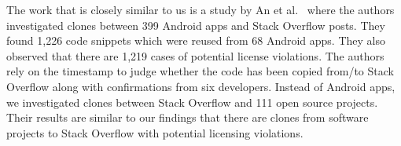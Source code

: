 \documentclass[sigconf,review, anonymous]{acmart}
\begin{document}
The work that is closely similar to us is a study by An et al.~\cite{An2017} where the authors investigated clones between 399 Android apps and Stack Overflow posts. They found 1,226 code snippets which were reused from 68 Android apps. They also observed that there are 1,219 cases of potential license violations. The authors rely on the timestamp to judge whether the code has been copied from/to Stack Overflow along with confirmations from six developers. Instead of Android apps, we investigated clones between Stack Overflow and 111 open source projects. Their results are similar to our findings that there are clones from software projects to Stack Overflow with potential licensing violations. %

%
\end{document}
